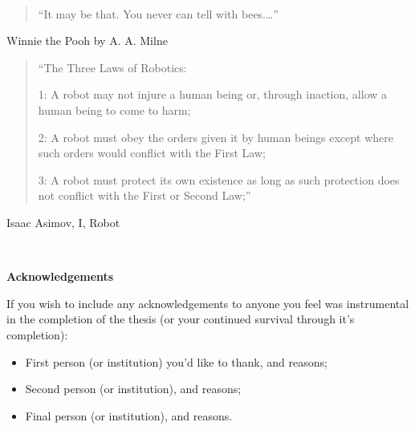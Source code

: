 
\newpage

\ 

\begin{quotation}
``It may be that. You never can tell with bees.\ldots''
\end{quotation}
\begin{flushright}
Winnie the Pooh by A. A. Milne
\end{flushright}

\vspace{1cm}

\begin{quotation}
``The Three Laws of Robotics:

1: A robot may not injure a human being or, through inaction, allow a human being to come to harm;

2: A robot must obey the orders given it by human beings except where such orders would conflict with the First Law;

3: A robot must protect its own existence as long as such protection does not conflict with the First or Second Law;''
\end{quotation}
\begin{flushright}
Isaac Asimov, I, Robot
\end{flushright}


\ 


\newpage

\begin{center}{\Large\bf Acknowledgements}\end{center}

\vspace{0.3cm}

\noindent If you wish to include any acknowledgements to anyone you feel was instrumental in the completion of the thesis (or your continued survival through it's completion):
\begin{itemize}
	\item First person (or institution) you'd like to thank, and reasons;

	\item Second person (or institution), and reasons;

	\item Final person (or institution), and reasons.
\end{itemize}

